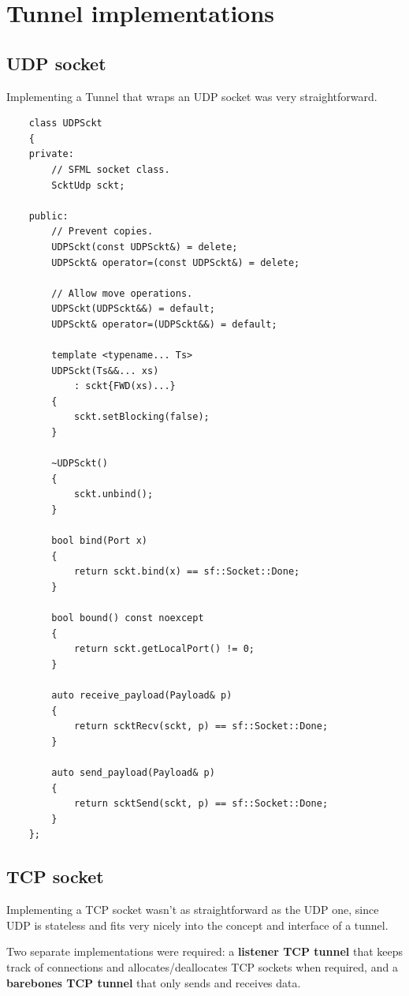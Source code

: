 \documentclass[11pt]{report}
\newcommand{\+}{\discretionary{\mbox{\scriptsize$\hookleftarrow$}}{}{}}
\renewcommand\emph{\textbf}
\begin{document}
\chapter{Tunnel implementations}
    \section{UDP socket}
        Implementing a Tunnel that wraps an UDP socket was very straightforward.

\begin{verbatim}
    class UDPSckt
    {
    private:
        // SFML socket class.
        ScktUdp sckt;

    public:
        // Prevent copies.
        UDPSckt(const UDPSckt&) = delete;
        UDPSckt& operator=(const UDPSckt&) = delete;

        // Allow move operations.
        UDPSckt(UDPSckt&&) = default;
        UDPSckt& operator=(UDPSckt&&) = default;

        template <typename... Ts>
        UDPSckt(Ts&&... xs)
            : sckt{FWD(xs)...}
        {
            sckt.setBlocking(false);
        }

        ~UDPSckt() 
        { 
            sckt.unbind(); 
        }

        bool bind(Port x) 
        { 
            return sckt.bind(x) == sf::Socket::Done; 
        }
        
        bool bound() const noexcept 
        { 
            return sckt.getLocalPort() != 0; 
        }

        auto receive_payload(Payload& p)
        {
            return scktRecv(sckt, p) == sf::Socket::Done;
        }

        auto send_payload(Payload& p)
        {
            return scktSend(sckt, p) == sf::Socket::Done;
        }
    };
\end{verbatim}

    \section{TCP socket}
        Implementing a TCP socket wasn't as straightforward as the UDP one, since UDP is stateless and fits very nicely into the concept and interface of a tunnel.

        Two separate implementations were required: a \emph{listener TCP tunnel} that keeps track of connections and allocates/deallocates TCP sockets when required, and a \emph{barebones TCP tunnel} that only sends and receives data.
\end{document}
